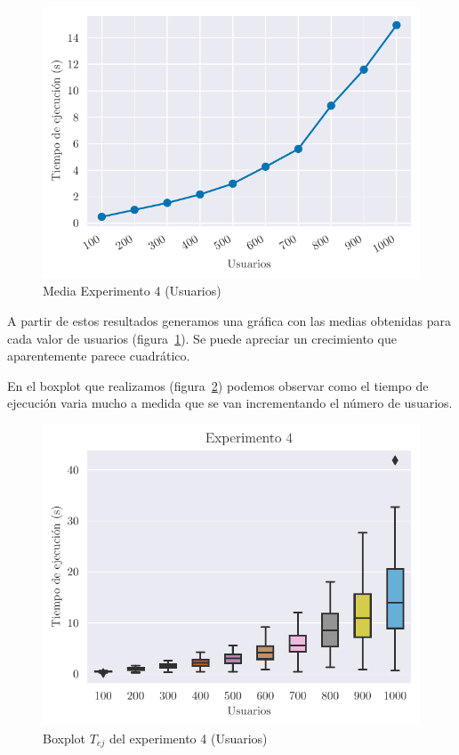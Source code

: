 \begin{figure}[H]
    \centering
    \includegraphics{include/plots/ex4_u_mean_time.pdf}
    \caption{Media Experimento 4 (Usuarios)}%
    \label{fig:ex4u_mean}
\end{figure}

A partir de estos resultados generamos una gráfica con las medias obtenidas para cada valor de usuarios (figura~\ref{fig:ex4u_mean}). Se puede apreciar un crecimiento que aparentemente parece cuadrático.

En el boxplot que realizamos (figura~\ref{fig:ex4u}) podemos observar como el tiempo de ejecución
varia mucho a medida que se van incrementando el número de usuarios.

\begin{figure}[H]
    \centering
    \includegraphics{include/plots/ex4_u_time_bplot.pdf}
    \caption{Boxplot $T_{ej}$ del experimento 4 (Usuarios)}%
    \label{fig:ex4u}
\end{figure}

